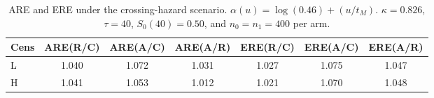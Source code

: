 \documentclass[12pt]{article}
\begin{document}
\begin{table}[ht]
\centering
\small
\caption{ARE and ERE under the crossing-hazard scenario.
  $\alpha(u)=\log(0.46)+(u/t_M)$.  $\kappa=0.826$, $\tau=40$,
  $S_0(40)=0.50$, and $n_0=n_1=400$ per arm.}
\label{tab:sim-crossing}
\setlength{\tabcolsep}{4pt}
\begin{tabular}{lcccccc}
\hline
Cens & ARE(R/C) & ARE(A/C) & ARE(A/R) & ERE(R/C) & ERE(A/C) & ERE(A/R) \\
\hline
L & 1.040 & 1.072 & 1.031 & 1.027 & 1.075 & 1.047 \\
H & 1.041 & 1.053 & 1.012 & 1.021 & 1.070 & 1.048 \\
\hline
\end{tabular}
\end{table}















\end{document}
